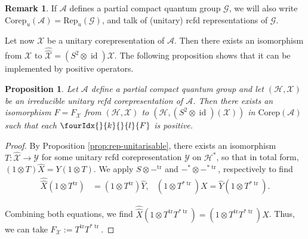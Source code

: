 \documentclass[11pt]{article}
\DeclareMathOperator{\id}{id}
\DeclareMathOperator{\tr}{\mathrm{tr}}
\newcommand{\dual}[1]{#1^{*}}
\newcommand{\dualop}[1]{#1^{\tr}}
\newcommand{\dualco}[1]{\hat{#1}}
\newcommand{\Corep}{\mathrm{Corep}}
\newcommand{\Hsp}{\mathcal{H}}
\newcommand{\Rep}{\mathrm{Rep}}
\newcommand{\Gr}[5]{\fourIdx{#2}{#4}{#3}{#5}{#1}}%
\newcommand{\Gru}[3]{\Gr{#1}{}{}{#2}{#3}}
\newtheorem{Prop}[Theorem]{Proposition}
\theoremstyle{definition}
\newtheorem{Rem}[Theorem]{Remark}
\numberwithin{equation}{section}
\begin{document}
\begin{Rem}If $\mathscr{A}$ defines a partial compact quantum group $\mathscr{G}$, we will also write $\Corep_u(\mathscr{A})= \Rep_u(\mathscr{G})$, and talk of (unitary) rcfd representations of $\mathscr{G}$.
 \end{Rem}  
   
Let now $\mathscr{X}$ be a unitary corepresentation of $\mathscr{A}$. Then there exists an isomorphism from $\mathscr{X}$ to $\dualco{\dualco{\mathscr{X}}} = (S^2\otimes \id)\mathscr{X}$. The following proposition shows that it can be implemented by positive operators.

\begin{Prop} \label{prop:rep-unitary-bidual}
  Let $\mathscr{A}$ define a partial compact quantum group and let
  $(\Hsp,\mathscr{X})$ be an irreducible unitary rcfd corepresentation of
  $\mathscr{A}$.  Then there exists an isomorphism $F=F_{\mathscr{X}}$
  from $(\Hsp,\mathscr{X})$ to 
  $(\Hsp,(S^{2} \otimes \id)(\mathscr{X}))$ in $\Corep(\mathscr{A})$ such
  that each $\Gru{F}{k}{l}$ is positive.
\end{Prop}
\begin{proof}
 By Proposition \ref{prop:rep-unitarisable}, there exists an
  isomorphism $T \colon \dualco{\mathscr{X}} \to \mathscr{Y}$ for some
  unitary rcfd corepresentation $\mathscr{Y}$ on $\dual{\Hsp}$, so that in total form,
  $(1\otimes T)\dualco{X} = Y(1 \otimes T)$.
We  apply   $S \otimes -^{\tr}$ and $-^{*} \otimes -^{*\tr}$,
respectively to find 
\begin{align*}
 \dualco{\dualco{X}}(1 \otimes \dualop{T}) &= (1 \otimes
  \dualop{T})\dualco{Y}, & (1 \otimes T^{*\tr})X=\dualco{Y}(1\otimes T^{*\tr}).
\end{align*}

Combining both equations, we
find $\dualco{\dualco{X}}(1 \otimes \dualop{T}T^{*\tr})=(1 \otimes
\dualop{T}T^{*\tr})X$. Thus, we can take
$F_{\mathscr{X}}:=\dualop{T}T^{*\tr}$.
\end{proof}
\end{document}
